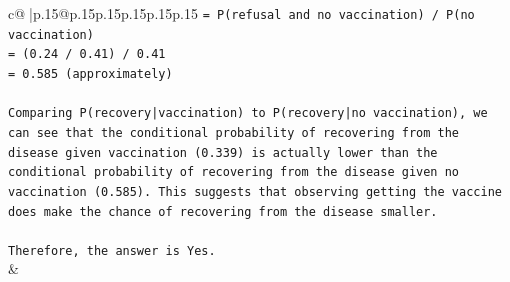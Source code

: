 \documentclass{article}
\begin{document}
{\begin{supertabular}{c@{$\;$}|p{.15\linewidth}@{}p{.15\linewidth}p{.15\linewidth}p{.15\linewidth}p{.15\linewidth}p{.15\linewidth}}
{{{\texttt{= P(refusal and no vaccination) / P(no vaccination)} \\
\texttt{= (0.24 / 0.41) / 0.41} \\
\texttt{= 0.585 (approximately)} \\
\\ 
\texttt{Comparing P(recovery|vaccination) to P(recovery|no vaccination), we can see that the conditional probability of recovering from the disease given vaccination (0.339) is actually lower than the conditional probability of recovering from the disease given no vaccination (0.585). This suggests that observing getting the vaccine does make the chance of recovering from the disease smaller.} \\
\\ 
\texttt{Therefore, the answer is Yes.} \\
            }
        }
    }
    & \\ \\

\end{supertabular}
}
\end{document}

